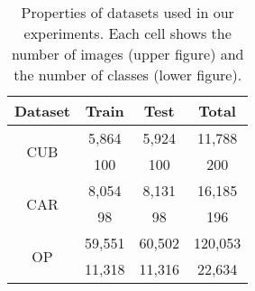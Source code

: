 \documentclass[9pt,technote,compsoc]{./sty/IEEEtran}
\begin{document}
\begin{table}[h]
	\centering
	\caption{Properties of datasets used in our experiments. Each cell shows the number of images (upper figure) and the number of classes (lower figure).}
	\label{tbl:clustering_dataset}
	\begin{tabular}{cccc}\toprule
		Dataset&Train&Test&Total\\\midrule
		\multirow{2}{*}{CUB \cite{wah2011caltech}}&5,864&5,924&11,788\\
		&100&100&200\\\midrule
		\multirow{2}{*}{CAR \cite{krause20133d}}&8,054&8,131&16,185\\
		&98&98&196\\\midrule
		\multirow{2}{*}{OP \cite{song2016deep}}&59,551&60,502&120,053\\
		&11,318&11,316&22,634\\\bottomrule
	\end{tabular}
\end{table}
\end{document}
